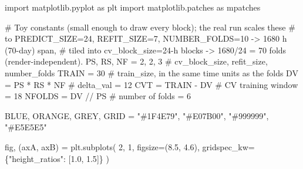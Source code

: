 \documentclass[
  english,
  letterpaper,
]{scrbook}
\newenvironment{Shaded}{\begin{snugshade}}{\end{snugshade}}
\newcommand{\CommentTok}[1]{\textcolor[rgb]{0.37,0.37,0.37}{#1}}
\newcommand{\DecValTok}[1]{\textcolor[rgb]{0.68,0.00,0.00}{#1}}
\newcommand{\FloatTok}[1]{\textcolor[rgb]{0.68,0.00,0.00}{#1}}
\newcommand{\ImportTok}[1]{\textcolor[rgb]{0.00,0.46,0.62}{#1}}
\newcommand{\NormalTok}[1]{\textcolor[rgb]{0.00,0.23,0.31}{#1}}
\newcommand{\OperatorTok}[1]{\textcolor[rgb]{0.37,0.37,0.37}{#1}}
\newcommand{\StringTok}[1]{\textcolor[rgb]{0.13,0.47,0.30}{#1}}
\begin{document}
\begin{Shaded}
\begin{Highlighting}[]
\ImportTok{import}\NormalTok{ matplotlib.pyplot }\ImportTok{as}\NormalTok{ plt}
\ImportTok{import}\NormalTok{ matplotlib.patches }\ImportTok{as}\NormalTok{ mpatches}

\CommentTok{\# Toy constants (small enough to draw every block); the real run scales these}
\CommentTok{\# to PREDICT\_SIZE=24, REFIT\_SIZE=7, NUMBER\_FOLDS=10 {-}\textgreater{} 1680 h (70{-}day) span,}
\CommentTok{\# tiled into cv\_block\_size=24{-}h blocks {-}\textgreater{} 1680/24 = 70 folds (render{-}independent).}
\NormalTok{PS, RS, NF }\OperatorTok{=} \DecValTok{2}\NormalTok{, }\DecValTok{2}\NormalTok{, }\DecValTok{3}          \CommentTok{\# cv\_block\_size, refit\_size, number\_folds}
\NormalTok{TRAIN }\OperatorTok{=} \DecValTok{30}                    \CommentTok{\# train\_size, in the same time units as the folds}
\NormalTok{DV }\OperatorTok{=}\NormalTok{ PS }\OperatorTok{*}\NormalTok{ RS }\OperatorTok{*}\NormalTok{ NF             }\CommentTok{\# delta\_val = 12}
\NormalTok{CVT }\OperatorTok{=}\NormalTok{ TRAIN }\OperatorTok{{-}}\NormalTok{ DV              }\CommentTok{\# CV training window = 18}
\NormalTok{NFOLDS }\OperatorTok{=}\NormalTok{ DV }\OperatorTok{//}\NormalTok{ PS             }\CommentTok{\# number of folds = 6}

\NormalTok{BLUE, ORANGE, GREY, GRID }\OperatorTok{=} \StringTok{"\#1F4E79"}\NormalTok{, }\StringTok{"\#E07B00"}\NormalTok{, }\StringTok{"\#999999"}\NormalTok{, }\StringTok{"\#E5E5E5"}

\NormalTok{fig, (axA, axB) }\OperatorTok{=}\NormalTok{ plt.subplots(}
    \DecValTok{2}\NormalTok{, }\DecValTok{1}\NormalTok{, figsize}\OperatorTok{=}\NormalTok{(}\FloatTok{8.5}\NormalTok{, }\FloatTok{4.6}\NormalTok{), gridspec\_kw}\OperatorTok{=}\NormalTok{\{}\StringTok{"height\_ratios"}\NormalTok{: [}\FloatTok{1.0}\NormalTok{, }\FloatTok{1.5}\NormalTok{]\}}
\NormalTok{)}


\end{Highlighting}
\end{Shaded}
\end{document}
